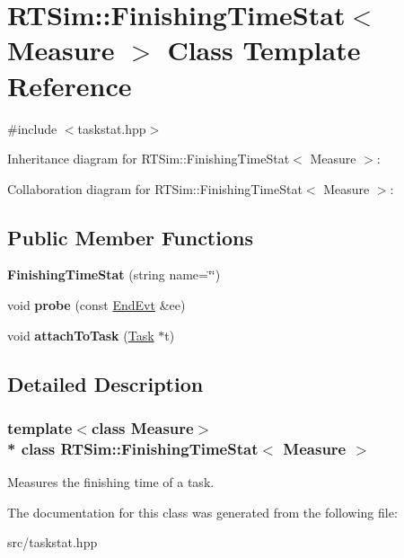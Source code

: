 \hypertarget{classRTSim_1_1FinishingTimeStat}{}\section{R\+T\+Sim\+:\+:Finishing\+Time\+Stat$<$ Measure $>$ Class Template Reference}
\label{classRTSim_1_1FinishingTimeStat}


{\ttfamily \#include $<$taskstat.\+hpp$>$}



Inheritance diagram for R\+T\+Sim\+:\+:Finishing\+Time\+Stat$<$ Measure $>$\+:


Collaboration diagram for R\+T\+Sim\+:\+:Finishing\+Time\+Stat$<$ Measure $>$\+:
\subsection*{Public Member Functions}
\begin{DoxyCompactItemize}
\item 
{\bfseries Finishing\+Time\+Stat} (string name=\char`\"{}\char`\"{})\hypertarget{classRTSim_1_1FinishingTimeStat_a50aaa922ceea3765e6901c397d866787}{}\label{classRTSim_1_1FinishingTimeStat_a50aaa922ceea3765e6901c397d866787}

\item 
void {\bfseries probe} (const \hyperlink{classRTSim_1_1EndEvt}{End\+Evt} \&ee)\hypertarget{classRTSim_1_1FinishingTimeStat_a58fdb16faaa933698fe7cc1b677c308b}{}\label{classRTSim_1_1FinishingTimeStat_a58fdb16faaa933698fe7cc1b677c308b}

\item 
void {\bfseries attach\+To\+Task} (\hyperlink{classRTSim_1_1Task}{Task} $\ast$t)\hypertarget{classRTSim_1_1FinishingTimeStat_a9258777f83d4834fe8e44c15fb8c31c8}{}\label{classRTSim_1_1FinishingTimeStat_a9258777f83d4834fe8e44c15fb8c31c8}

\end{DoxyCompactItemize}


\subsection{Detailed Description}
\subsubsection*{template$<$class Measure$>$\\*
class R\+T\+Sim\+::\+Finishing\+Time\+Stat$<$ Measure $>$}

Measures the finishing time of a task. 

The documentation for this class was generated from the following file\+:\begin{DoxyCompactItemize}
\item 
src/taskstat.\+hpp\end{DoxyCompactItemize}
